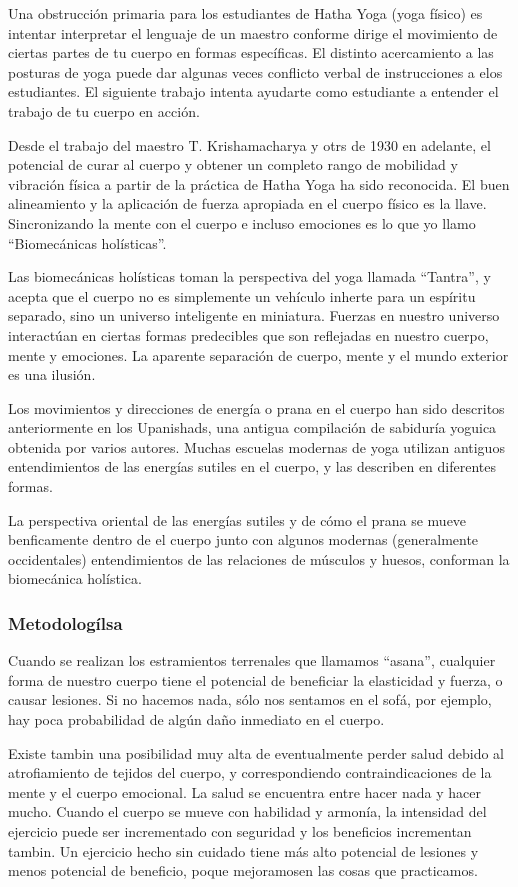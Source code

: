 Una obstrucción primaria para los estudiantes de Hatha Yoga (yoga físico) es intentar interpretar el lenguaje de un maestro conforme dirige el movimiento de ciertas partes de tu cuerpo en formas específicas. El distinto acercamiento a las posturas de yoga puede dar algunas veces conflicto verbal de instrucciones a elos estudiantes. El siguiente trabajo intenta ayudarte como estudiante a entender el trabajo de tu cuerpo en acción.

Desde el trabajo del maestro T. Krishamacharya y otrs de 1930 en adelante, el potencial de curar al cuerpo y obtener un completo rango de mobilidad y vibración física a partir de la práctica de Hatha Yoga ha sido reconocida. El buen alineamiento y la aplicación de fuerza apropiada en el cuerpo físico es la llave. Sincronizando la mente con el cuerpo e incluso emociones es lo que yo llamo ``Biomecánicas holísticas''.

Las biomecánicas holísticas toman la perspectiva del yoga llamada ``Tantra'', y acepta que el cuerpo no es simplemente un vehículo inherte para un espíritu separado, sino un universo inteligente en miniatura. Fuerzas en nuestro universo interactúan en ciertas formas predecibles que son reflejadas en nuestro cuerpo, mente y emociones. La aparente separación de cuerpo, mente y el mundo exterior es una ilusión.

Los movimientos y direcciones de energía o prana en el cuerpo han sido descritos anteriormente en los Upanishads, una antigua compilación de sabiduría yoguica obtenida por varios autores. Muchas escuelas modernas de yoga utilizan antiguos entendimientos de las energías sutiles en el cuerpo, y las describen en diferentes formas.

La perspectiva oriental de las energías sutiles y de cómo el prana se mueve benficamente dentro de el cuerpo junto con algunos modernas (generalmente occidentales) entendimientos de las relaciones de músculos y huesos, conforman la biomecánica holística.

\subsubsection{Metodologílsa}
Cuando se realizan los estramientos terrenales que llamamos ``asana'', cualquier forma de nuestro cuerpo tiene el potencial de beneficiar la elasticidad y fuerza, o causar lesiones. Si no hacemos nada, sólo nos sentamos en el sofá, por ejemplo, hay poca probabilidad de algún daño inmediato en el cuerpo.

Existe tambin una posibilidad muy alta de eventualmente perder salud debido al atrofiamiento de tejidos del cuerpo, y correspondiendo contraindicaciones de la mente y el cuerpo emocional. La salud se encuentra entre hacer nada y hacer mucho. Cuando el cuerpo se mueve con habilidad y armonía, la intensidad del ejercicio puede ser incrementado con seguridad y los beneficios incrementan tambin. Un ejercicio hecho sin cuidado tiene más alto potencial de lesiones y menos potencial de beneficio, poque mejoramosen las cosas que practicamos.


